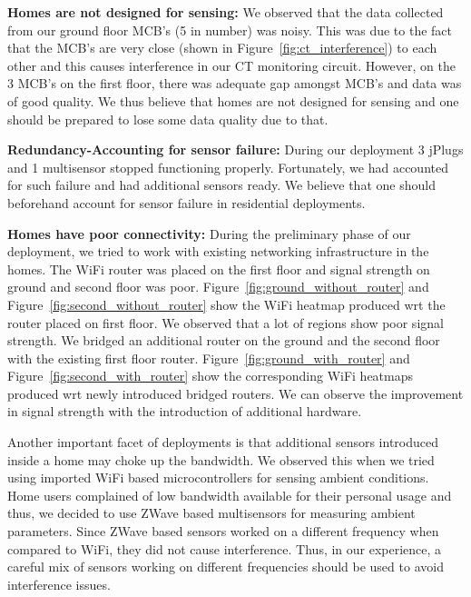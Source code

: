 \documentclass[10pt]{sensys-proc}
\newcommand{\figref}[1]{Figure~\ref{#1}}
\begin{document}
\noindent \textbf{Homes are not designed for sensing:} We observed that the data collected from our ground floor MCB's (5 in number) was noisy. This was due to the fact that the MCB's are very close (shown in \figref{fig:ct_interference}) to each other and this causes interference in our CT monitoring circuit. However, on the 3 MCB's on the first floor, there was adequate gap amongst MCB's and data was of good quality. We thus believe that homes are not designed for sensing and one should be prepared to lose some data quality due to that.

\noindent \textbf{Redundancy-Accounting for sensor failure:} During our deployment 3 jPlugs and 1 multisensor stopped functioning properly. Fortunately, we had accounted for such failure and had additional sensors ready. We believe that one should beforehand  account for sensor failure in residential deployments.

\noindent \textbf{Homes have poor connectivity:} During the preliminary phase of our deployment, we tried to work with existing networking infrastructure in the homes. The WiFi router was placed on the first floor and signal strength on ground and second floor was poor. \figref{fig:ground_without_router} and \figref{fig:second_without_router} show the WiFi heatmap produced wrt the router placed on first floor. We observed that a lot of regions show poor signal strength. We bridged an additional router on the ground and the second floor with the existing first floor router. \figref{fig:ground_with_router} and \figref{fig:second_with_router} show the corresponding WiFi heatmaps produced wrt newly introduced bridged routers. We can observe the improvement in signal strength with the introduction of additional hardware. 

\noindent Another important facet of deployments is that additional sensors introduced inside a home may choke up the bandwidth. We observed this when we tried using imported WiFi based microcontrollers for sensing ambient conditions. Home users complained of low bandwidth available for their personal usage and thus, we decided to use ZWave based multisensors for measuring ambient parameters. Since ZWave based sensors worked on a different frequency when compared to WiFi, they did not cause interference. Thus, in our experience, a careful mix of sensors working on different frequencies should be used to avoid interference issues.
\end{document}
